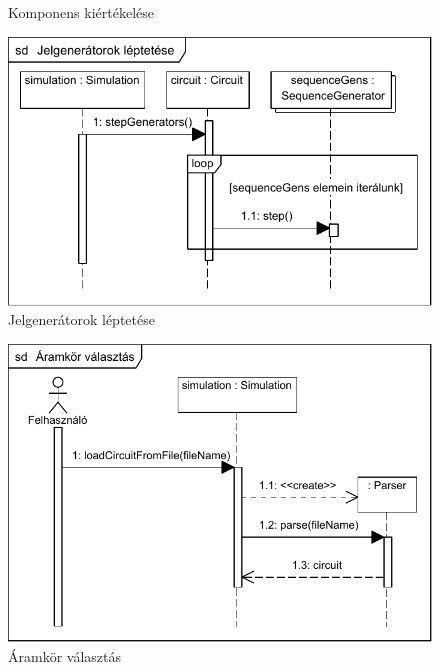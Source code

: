 \begin{figure}[H]
\begin{center}
\caption{Komponens kiértékelése}
\label{fig:component_sim}
\end{center}
\end{figure}

\begin{figure}[H]
\begin{center}
\includegraphics{chapters/chapter03/seqdiagrams/jelgeneratorok_leptetese.pdf}
\caption{Jelgenerátorok léptetése}
\label{fig:step_gens}
\end{center}
\end{figure}

\begin{figure}[H]
\begin{center}
\includegraphics{chapters/chapter03/seqdiagrams/aramkor_valasztas.pdf}
\caption{Áramkör választás}
\label{fig:aramkor_valasztas}
\end{center}
\end{figure}

